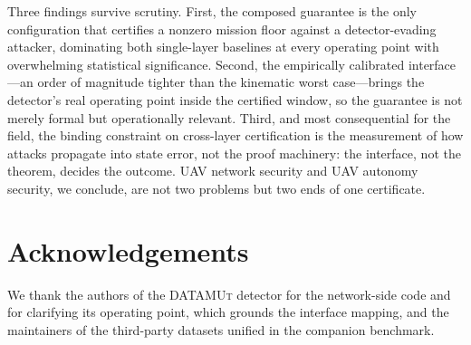 \documentclass[conference]{IEEEtran}
\begin{document}
Three findings survive scrutiny. First, the composed guarantee is the only
configuration that certifies a nonzero mission floor against a detector-evading
attacker, dominating both single-layer baselines at every operating point with
overwhelming statistical significance. Second, the empirically calibrated
interface---an order of magnitude tighter than the kinematic worst
case---brings the detector's real operating point inside the certified window,
so the guarantee is not merely formal but operationally relevant. Third, and
most consequential for the field, the binding constraint on cross-layer
certification is the measurement of how attacks propagate into state error, not
the proof machinery: the interface, not the theorem, decides the outcome. UAV
network security and UAV autonomy security, we conclude, are not two problems but
two ends of one certificate.

\section*{Acknowledgements}
We thank the authors of the \textsc{DATAMUt} detector for the network-side code
and for clarifying its operating point, which grounds the interface mapping, and
the maintainers of the third-party datasets unified in the companion benchmark.



\end{document}
